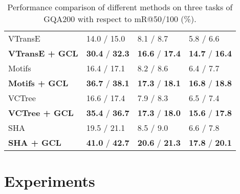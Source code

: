 \documentclass[10pt,twocolumn,letterpaper]{article}
\begin{document}
{\begin{table}[t]
\begin{tabular}{p{2.3cm}|p{1.7cm}<{\centering}|p{1.4cm}<{\centering}|p{1.4cm}<{\centering}}
		VTransE &14.0 / 15.0  & 8.1 / 8.7 & 5.8 / 6.6  \\ 
		\textbf{VTransE + GCL} &\textbf{30.4} / \textbf{32.3} &\textbf{16.6} / \textbf{17.4}  &\textbf{14.7} / \textbf{16.4}  \\
		\hline
		
		Motifs &16.4 / 17.1  &8.2 / 8.6  &6.4 / 7.7 \\ 
		\textbf{Motifs + GCL} &\textbf{36.7} / \textbf{38.1} &\textbf{17.3} / \textbf{18.1}  &\textbf{16.8} / \textbf{18.8}  \\
		\hline
		
		VCTree &16.6 / 17.4 & 7.9 / 8.3  & 6.5 / 7.4  \\
		\textbf{VCTree + GCL} &\textbf{35.4} / \textbf{36.7} &\textbf{17.3} / \textbf{18.0} &\textbf{15.6} / \textbf{17.8}\\
		 \hline
		 
		SHA &19.5 / 21.1  & 8.5 / 9.0  & 6.6 / 7.8    \\
		\textbf{SHA + GCL} &\textbf{41.0} / \textbf{42.7} &\textbf{20.6} / \textbf{21.3}  &\textbf{17.8} / \textbf{20.1}  \\
		 \hline
		
	\end{tabular}
\vspace{0.02cm}
\caption{Performance comparison of different methods on three tasks of GQA200 with respect to mR@50/100 (\%).}
\vspace{-0.4cm}
\label{result_GQA}
\end{table}


\section{Experiments}

}
\end{document}
